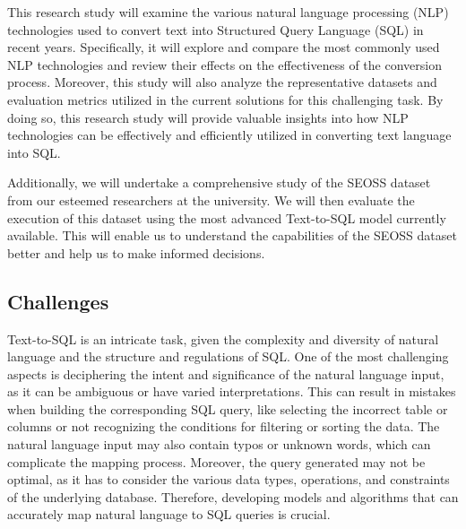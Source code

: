 This research study will examine the various natural language processing (NLP) technologies used to convert text into Structured Query Language (SQL) in recent years. Specifically, it will explore and compare the most commonly used NLP technologies and review their effects on the effectiveness of the conversion process. Moreover, this study will also analyze the representative datasets and evaluation metrics utilized in the current solutions for this challenging task. By doing so, this research study will provide valuable insights into how NLP technologies can be effectively and efficiently utilized in converting text language into SQL.

Additionally, we will undertake a comprehensive study of the SEOSS dataset from our esteemed researchers at the university. We will then evaluate the execution of this dataset using the most advanced Text-to-SQL model currently available. This will enable us to understand the capabilities of the SEOSS dataset better and help us to make informed decisions.

\subsection{Challenges}

Text-to-SQL is an intricate task, given the complexity and diversity of natural language and the structure and regulations of SQL. One of the most challenging aspects is deciphering the intent and significance of the natural language input, as it can be ambiguous or have varied interpretations. This can result in mistakes when building the corresponding SQL query, like selecting the incorrect table or columns or not recognizing the conditions for filtering or sorting the data. The natural language input may also contain typos or unknown words, which can complicate the mapping process. Moreover, the query generated may not be optimal, as it has to consider the various data types, operations, and constraints of the underlying database. Therefore, developing models and algorithms that can accurately map natural language to SQL queries is crucial.

